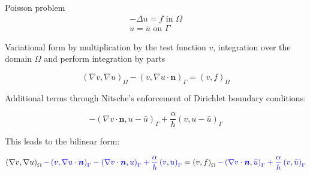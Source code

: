\documentclass[A4]{scrartcl}
\title{}
\author{}
\begin{document}
%

Poisson problem
\begin{align}
	- \Delta u = f \text{ in } \Omega \\
	u = \bar{u} \text{ on } \Gamma
\end{align}

Variational form by multiplication by the test function $v$, integration over the domain $\Omega$ and perform integration by parts

\begin{equation}
	\left(\nabla v,\nabla  u\right)_\Omega - \left(v, \nabla u \cdot \boldsymbol{n} \right)_{\Gamma} = \left(v, f\right)_\Omega
\end{equation}


Additional terms through Nitsche's enforcement of Dirichlet boundary conditions:

\begin{equation}
	- \left(\nabla v\cdot \boldsymbol{n}, u - \bar{u} \right)_{\Gamma} + \frac{\alpha}{h} \left(v, u - \bar{u} \right)_{\Gamma}
\end{equation}

This leads to the bilinear form:

\begin{equation}
	\left(\nabla v,\nabla  u\right)_\Omega
	\textcolor{blue}{ - \left(v, \nabla u \cdot \boldsymbol{n} \right)_{\Gamma} -\left(\nabla v\cdot \boldsymbol{n}, u \right)_{\Gamma} + \frac{\alpha}{h} \left(v, u \right)_{\Gamma}} = \left(v, f\right)_\Omega 
	\textcolor{blue}{-\left(\nabla v\cdot \boldsymbol{n}, \bar{u} \right)_{\Gamma} + \frac{\alpha}{h} \left(v, \bar{u} \right)_{\Gamma}}
\end{equation}
\end{document}
